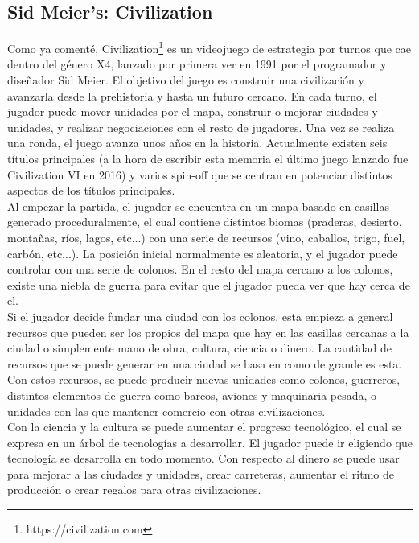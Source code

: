 \subsection{Sid Meier's: Civilization}\label{subsec:civ}

Como ya comenté, Civilization\footnote{https://civilization.com} es un videojuego de estrategia por turnos que cae dentro del género X4, lanzado por primera ver en 1991 por el programador y diseñador Sid Meier. El objetivo del juego es construir una civilización y avanzarla desde la prehistoria y hasta un futuro cercano. En cada turno, el jugador puede mover unidades por el mapa, construir o mejorar ciudades y unidades, y realizar negociaciones con el resto de jugadores. Una vez se realiza una ronda, el juego avanza unos años en la historia. Actualmente existen seis títulos principales (a la hora de escribir esta memoria el último juego lanzado fue Civilization VI en 2016) y varios spin-off que se centran en potenciar distintos aspectos de los títulos principales. \\

Al empezar la partida, el jugador se encuentra en un mapa basado en casillas generado proceduralmente, el cual contiene distintos biomas (praderas, desierto, montañas, ríos, lagos, etc...) con una serie de recursos (vino, caballos, trigo, fuel, carbón, etc...). La posición inicial normalmente es aleatoria, y el jugador puede controlar con una serie de colonos. En el resto del mapa cercano a los colonos, existe una niebla de guerra para evitar que el jugador pueda ver que hay cerca de el. \\

Si el jugador decide fundar una ciudad con los colonos, esta empieza a general recursos que pueden ser los propios del mapa que hay en las casillas cercanas a la ciudad o simplemente mano de obra, cultura, ciencia o dinero. La cantidad de recursos que se puede generar en una ciudad se basa en como de grande es esta. Con estos recursos, se puede producir nuevas unidades como colonos, guerreros, distintos elementos de guerra como barcos, aviones y maquinaria pesada, o unidades con las que mantener comercio con otras civilizaciones. \\

Con la ciencia y la cultura se puede aumentar el progreso tecnológico, el cual se expresa en un árbol de tecnologías a desarrollar. El jugador puede ir eligiendo que tecnología se desarrolla en todo momento. Con respecto al dinero se puede usar para mejorar a las ciudades y unidades, crear carreteras, aumentar el ritmo de producción o crear regalos para otras civilizaciones. \\

